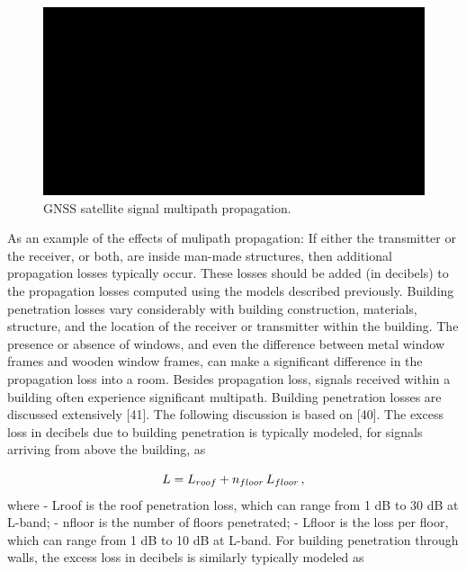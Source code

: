 \begin{figure}[ht]
	\centering
	\includegraphics[width=1.0\textwidth]{Chapters/Figures/demo.png}
	\caption{GNSS satellite signal multipath propagation.}
	\label{fig:multipath}
\end{figure}

As an example of the effects of mulipath propagation:
If either the transmitter or the receiver, or both, are inside man-made structures, then additional propagation losses typically occur. These losses should be added (in decibels) to the propagation losses computed using the models described previously.
Building penetration losses vary considerably with building construction, materials, structure, and the location of the receiver or transmitter within the building. The presence or absence of windows, and even the difference between metal window frames and wooden window frames, can make a significant difference in the propagation loss into a room. Besides propagation loss, signals received within a building often experience significant multipath. 
Building penetration losses are discussed extensively [41]. The following discussion is based on [40]. The excess loss in decibels due to building penetration is typically modeled, for signals arriving from above the building, as

\begin{equation}
    L=L_{roof}+n_{floor}\,L_{floor}\,,\medskip
\end{equation}
where
- Lroof is the roof penetration loss, which can range from 1 dB to 30 dB at L-band;
- nfloor is the number of floors penetrated;
- Lfloor is the loss per floor, which can range from 1 dB to 10 dB at L-band. For building penetration through walls, the excess loss in decibels is similarly typically modeled as

